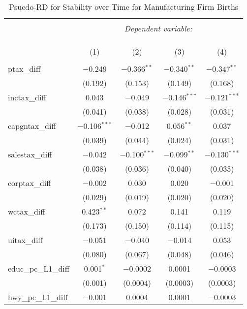 
\begin{table}[!htbp] \centering 
  \caption{Psuedo-RD for Stability over Time for  Manufacturing Firm Births} 
  \label{} 
\begin{tabular}{@{\extracolsep{5pt}}lcccc} 
\\[-1.8ex]\hline 
\hline \\[-1.8ex] 
 & \multicolumn{4}{c}{\textit{Dependent variable:}} \\ 
\cline{2-5} 
\\[-1.8ex] & \multicolumn{4}{c}{ } \\ 
\\[-1.8ex] & (1) & (2) & (3) & (4)\\ 
\hline \\[-1.8ex] 
 ptax\_diff & $-$0.249 & $-$0.366$^{**}$ & $-$0.340$^{**}$ & $-$0.347$^{**}$ \\ 
  & (0.192) & (0.153) & (0.149) & (0.168) \\ 
  inctax\_diff & 0.043 & $-$0.049 & $-$0.146$^{***}$ & $-$0.121$^{***}$ \\ 
  & (0.041) & (0.038) & (0.028) & (0.031) \\ 
  capgntax\_diff & $-$0.106$^{***}$ & $-$0.012 & 0.056$^{**}$ & 0.037 \\ 
  & (0.039) & (0.044) & (0.024) & (0.031) \\ 
  salestax\_diff & $-$0.042 & $-$0.100$^{***}$ & $-$0.099$^{**}$ & $-$0.130$^{***}$ \\ 
  & (0.038) & (0.036) & (0.040) & (0.035) \\ 
  corptax\_diff & $-$0.002 & 0.030 & 0.020 & $-$0.001 \\ 
  & (0.029) & (0.019) & (0.020) & (0.020) \\ 
  wctax\_diff & 0.423$^{**}$ & 0.072 & 0.141 & 0.119 \\ 
  & (0.173) & (0.150) & (0.114) & (0.115) \\ 
  uitax\_diff & $-$0.051 & $-$0.040 & $-$0.014 & 0.053 \\ 
  & (0.080) & (0.067) & (0.048) & (0.046) \\ 
  educ\_pc\_L1\_diff & 0.001$^{*}$ & $-$0.0002 & 0.0001 & $-$0.0003 \\ 
  & (0.001) & (0.0004) & (0.0003) & (0.0003) \\ 
  hwy\_pc\_L1\_diff & $-$0.001 & 0.0004 & 0.0001 & $-$0.0003 \\ 

\end{tabular}
\end{table}
